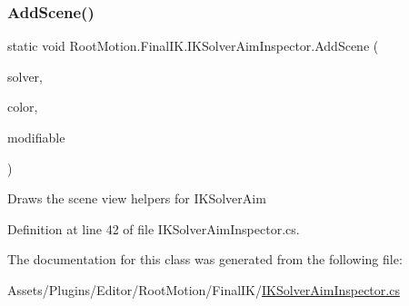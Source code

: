 \subsubsection{\texorpdfstring{Add\+Scene()}{AddScene()}}
{\footnotesize\ttfamily static void Root\+Motion.\+Final\+I\+K.\+I\+K\+Solver\+Aim\+Inspector.\+Add\+Scene (\begin{DoxyParamCaption}\item[{I\+K\+Solver\+Aim}]{solver,  }\item[{Color}]{color,  }\item[{bool}]{modifiable }\end{DoxyParamCaption})\hspace{0.3cm}{\ttfamily [static]}}



Draws the scene view helpers for I\+K\+Solver\+Aim 



Definition at line 42 of file I\+K\+Solver\+Aim\+Inspector.\+cs.



The documentation for this class was generated from the following file\+:\begin{DoxyCompactItemize}
\item 
Assets/\+Plugins/\+Editor/\+Root\+Motion/\+Final\+I\+K/\mbox{\hyperlink{_i_k_solver_aim_inspector_8cs}{I\+K\+Solver\+Aim\+Inspector.\+cs}}\end{DoxyCompactItemize}
